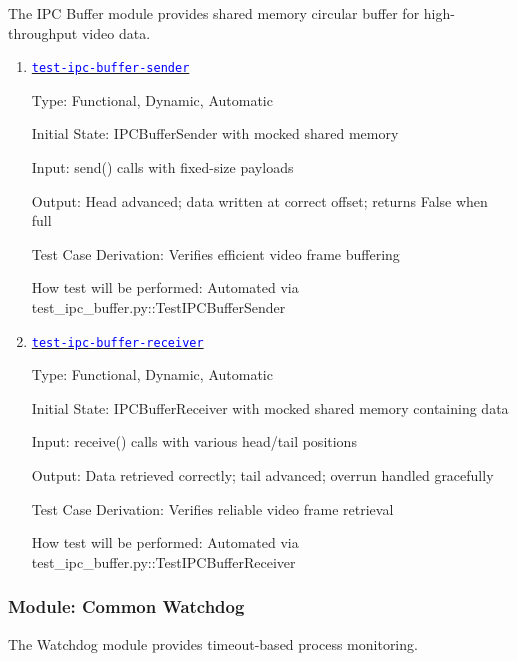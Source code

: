\documentclass[12pt, titlepage]{article}
\newcommand{\tid}[1]{\hyperlink{tid:#1}{\textcolor{blue}{\texttt{#1}}}}
\begin{document}
The IPC Buffer module provides shared memory circular buffer for
high-throughput video data.

\begin{enumerate}

  \item{\tid{test-ipc-buffer-sender}\\}

        Type: Functional, Dynamic, Automatic

        Initial State: IPCBufferSender with mocked shared memory

        Input: send() calls with fixed-size payloads

        Output: Head advanced; data written at correct offset; returns False when full

        Test Case Derivation: Verifies efficient video frame buffering

        How test will be performed: Automated via
        test\_ipc\_buffer.py::TestIPCBufferSender

  \item{\tid{test-ipc-buffer-receiver}\\}

        Type: Functional, Dynamic, Automatic

        Initial State: IPCBufferReceiver with mocked shared memory containing data

        Input: receive() calls with various head/tail positions

        Output: Data retrieved correctly; tail advanced; overrun handled gracefully

        Test Case Derivation: Verifies reliable video frame retrieval

        How test will be performed: Automated via
        test\_ipc\_buffer.py::TestIPCBufferReceiver

\end{enumerate}

\subsubsection{Module: Common Watchdog}

The Watchdog module provides timeout-based process monitoring.
\end{document}
